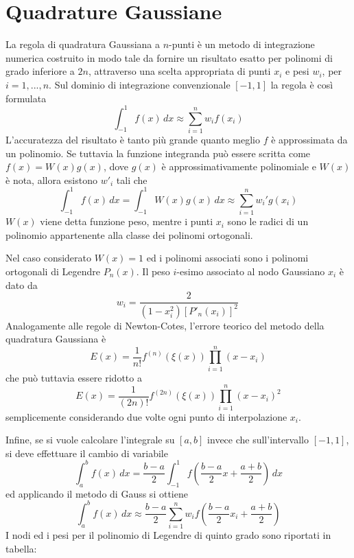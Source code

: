 \section{Quadrature Gaussiane}
La regola di quadratura Gaussiana a $n$-punti è un metodo di integrazione numerica costruito in modo tale da fornire un risultato esatto per polinomi di grado inferiore a $2n$, attraverso una scelta appropriata di punti $x_i$ e pesi $w_i$, per $i=1,...,n$. Sul dominio di integrazione convenzionale $[-1,1]$ la regola è così formulata
$$\int_{-1}^1 f(x)\,dx \approx \sum_{i=1}^n w_i f(x_i)$$
L'accuratezza del risultato è tanto più grande quanto meglio $f$ è approssimata da un polinomio. Se tuttavia la funzione integranda può essere scritta come $f(x)=W(x)g(x)$, dove $g(x)$ è approssimativamente polinomiale e $W(x)$ è nota, allora esistono $w'_i$ tali che
$$\int_{-1}^1 f(x)\,dx = \int_{-1}^1 W(x) g(x)\,dx \approx \sum_{i=1}^n w_i' g(x_i)$$
$W(x)$ viene detta funzione peso, mentre i punti $x_i$ sono le radici di un polinomio appartenente alla classe dei polinomi ortogonali.

Nel caso considerato $W(x)=1$ ed i polinomi associati sono i polinomi ortogonali di Legendre $P_n(x)$. Il peso $i$-esimo associato al nodo Gaussiano $x_i$ è dato da
$$ w_i = \frac{2}{\left( 1-x_i^2 \right) [P'_n(x_i)]^2} \,\!$$
Analogamente alle regole di Newton-Cotes, l'errore teorico del metodo della quadratura Gaussiana è
$$E(x)=\frac{1}{n!}f^{(n)}(\xi(x))\prod_{i=1}^n(x-x_i)$$
che può tuttavia essere ridotto a
$$E(x)=\frac{1}{(2n)!}f^{(2n)}(\xi(x))\prod_{i=1}^n(x-x_i)^2$$
semplicemente considerando due volte ogni punto di interpolazione $x_i$.

Infine, se si vuole calcolare l'integrale su $[a,b]$ invece che sull'intervallo $[-1,1]$, si deve effettuare il cambio di variabile
$$\int_a^b f(x)\,dx = \frac{b-a}{2} \int_{-1}^1 f\left(\frac{b-a}{2}x + \frac{a+b}{2}\right)\,dx $$
ed applicando il metodo di Gauss si ottiene
$$\int_a^b f(x)\,dx \approx \frac{b-a}{2} \sum_{i=1}^n w_i f\left(\frac{b-a}{2}x_i + \frac{a+b}{2}\right)$$
I nodi ed i pesi per il polinomio di Legendre di quinto grado sono riportati in tabella:
\begin{center}
\end{center}

